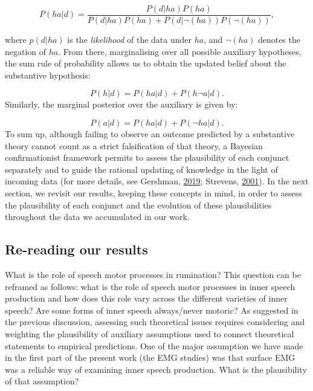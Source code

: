 \documentclass[a4paper,12pt,twoside,onecolumn,openright,final,oldfontcommands]{memoir}
\begin{document}
\[
P(h a | d) = \frac{P(d | h a) P(h a)}{P(d | h a) P(h a)+P(d | \neg(h a)) P(\neg(h a))},
\]

where \(p(d|ha)\) is the \emph{likelihood} of the data under \(ha\), and \(\lnot (ha)\) denotes the negation of \(ha\). From there, marginalising over all possible auxiliary hypotheses, the sum rule of probability allows us to obtain the updated belief about the substantive hypothesis:

\[P(h | d) = P(h a | d) + P(h \neg a | d).\]
Similarly, the marginal posterior over the auxiliary is given by:

\[P(a | d) = P(h a | d) + P(\neg h a | d).\]
To sum up, although failing to observe an outcome predicted by a substantive theory cannot count as a strict falsification of that theory, a Bayesian confirmationist framework permits to assess the plausibility of each conjunct separately and to guide the rational updating of knowledge in the light of incoming data (for more details, see Gershman, \protect\hyperlink{ref-gershman_how_2019}{2019}; Strevens, \protect\hyperlink{ref-strevens_bayesian_2001}{2001}). In the next section, we revisit our results, keeping these concepts in mind, in order to assess the plausibility of each conjunct and the evolution of these plausibilities throughout the data we accumulated in our work.

\hypertarget{re-reading-our-results}{%
\subsection{Re-reading our results}\label{re-reading-our-results}}

What is the role of speech motor processes in rumination? This question can be reframed as follows: what is the role of speech motor processes in inner speech production and how does this role vary across the different varieties of inner speech? Are some forms of inner speech always/never motoric? As suggested in the previous discussion, assessing such theoretical issues requires considering and weighting the plausibility of auxiliary assumptions used to connect theoretical statements to empirical predictions. One of the major assumption we have made in the first part of the present work (the EMG studies) was that surface EMG was a reliable way of examining inner speech production. What is the plausibility of that assumption?
\end{document}
